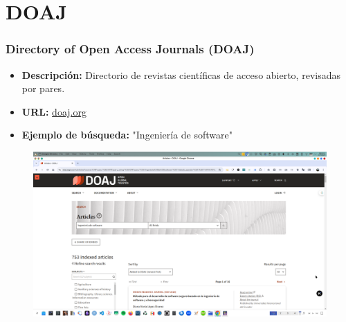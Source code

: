 \documentclass[
11pt, %
]{beamer}
\begin{document}
\section{DOAJ}
\begin{frame}
	\frametitle{Directory of Open Access Journals (DOAJ)}
	\begin{itemize}
		\item \textbf{Descripción:} Directorio de revistas científicas de acceso abierto, revisadas por pares.
		\item \textbf{URL:} \href{https://doaj.org}{doaj.org}
		\item \textbf{Ejemplo de búsqueda:} "Ingeniería de software"
	\end{itemize}
		\begin{figure}
		\centering
		\includegraphics[width=0.9\linewidth]{images/doaj.png}
		\label{fig:screenshot010}
	\end{figure}
\end{frame}

\end{document}
